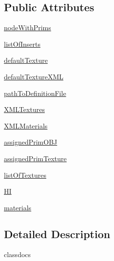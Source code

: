 \subsection*{Public Attributes}
\begin{DoxyCompactItemize}
\item 
\hyperlink{classdestruction_1_1_model___texture_1_1_model___texture_a0b7ed79a1d551b932fed1c66a034a7bd}{node\-With\-Prims}
\item 
\hyperlink{classdestruction_1_1_model___texture_1_1_model___texture_adfd0f11306e59e84564a53e9c15e0ae7}{list\-Of\-Inserts}
\item 
\hyperlink{classdestruction_1_1_model___texture_1_1_model___texture_a99258072ec96f0f522439d96516ac5ff}{default\-Texture}
\item 
\hyperlink{classdestruction_1_1_model___texture_1_1_model___texture_acb552a8ca34a11d9bb9010d08be92e5d}{default\-Texture\-X\-M\-L}
\item 
\hyperlink{classdestruction_1_1_model___texture_1_1_model___texture_acc7b04fe40f8bebbd344d92f1e050184}{path\-To\-Definition\-File}
\item 
\hyperlink{classdestruction_1_1_model___texture_1_1_model___texture_a58d8def7a1f442a8a2d5a113f0ac7f70}{X\-M\-L\-Textures}
\item 
\hyperlink{classdestruction_1_1_model___texture_1_1_model___texture_a207e023f2bc73db330d76986929f66c0}{X\-M\-L\-Materials}
\item 
\hyperlink{classdestruction_1_1_model___texture_1_1_model___texture_a4fbaf9b54842fd5d35b7e11f64fb2a0f}{assigned\-Prim\-O\-B\-J}
\item 
\hyperlink{classdestruction_1_1_model___texture_1_1_model___texture_a3b17455fd3db174ddc425b55c9f666b3}{assigned\-Prim\-Texture}
\item 
\hyperlink{classdestruction_1_1_model___texture_1_1_model___texture_ae50fe76a772b6822bf5916c9ff9e52bb}{list\-Of\-Textures}
\item 
\hyperlink{classdestruction_1_1_model___texture_1_1_model___texture_aa4d920cb6b9a1d03566e0cf7bdcf542a}{H\-I}
\item 
\hyperlink{classdestruction_1_1_model___texture_1_1_model___texture_ab4cd42e8f8b43bf0bf96057b624cdf3a}{materials}
\end{DoxyCompactItemize}


\subsection{Detailed Description}
\begin{DoxyVerb}classdocs
\end{DoxyVerb}
 

